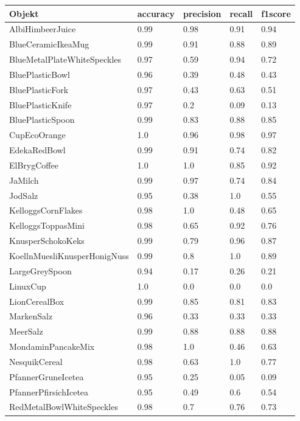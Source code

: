 \begin{table}
\centering
\small
{}
\begin{tabularx}{\textwidth}{Xllll}
\textbf{Objekt}	& \textbf{\gls{accuracy}} & \textbf{\gls{precision}}	& \textbf{\gls{recall}}	& \textbf{\gls{f1score}} \\ \hline
AlbiHimbeerJuice & 0.99 & 0.98 & 0.91 & 0.94 \\  
BlueCeramicIkeaMug & 0.99 & 0.91 & 0.88 & 0.89 \\  
BlueMetalPlateWhiteSpeckles & 0.97 & 0.59 & 0.94 & 0.72 \\  
BluePlasticBowl & 0.96 & 0.39 & 0.48 & 0.43 \\  
BluePlasticFork & 0.97 & 0.43 & 0.63 & 0.51 \\  
BluePlasticKnife & 0.97 & 0.2 & 0.09 & 0.13 \\  
BluePlasticSpoon & 0.99 & 0.83 & 0.88 & 0.85 \\  
CupEcoOrange & 1.0 & 0.96 & 0.98 & 0.97 \\  
EdekaRedBowl & 0.99 & 0.91 & 0.74 & 0.82 \\  
ElBrygCoffee & 1.0 & 1.0 & 0.85 & 0.92 \\  
JaMilch & 0.99 & 0.97 & 0.74 & 0.84 \\  
JodSalz & 0.95 & 0.38 & 1.0 & 0.55 \\  
KelloggsCornFlakes & 0.98 & 1.0 & 0.48 & 0.65 \\  
KelloggsToppasMini & 0.98 & 0.65 & 0.92 & 0.76 \\  
KnusperSchokoKeks & 0.99 & 0.79 & 0.96 & 0.87 \\  
KoellnMuesliKnusperHonigNuss & 0.99 & 0.8 & 1.0 & 0.89 \\  
LargeGreySpoon & 0.94 & 0.17 & 0.26 & 0.21 \\  
LinuxCup & 1.0 & 0.0 & 0.0 & 0.0 \\  
LionCerealBox & 0.99 & 0.85 & 0.81 & 0.83 \\  
MarkenSalz & 0.96 & 0.33 & 0.33 & 0.33 \\  
MeerSalz & 0.99 & 0.88 & 0.88 & 0.88 \\  
MondaminPancakeMix & 0.98 & 1.0 & 0.46 & 0.63 \\  
NesquikCereal & 0.98 & 0.63 & 1.0 & 0.77 \\  
PfannerGruneIcetea & 0.95 & 0.25 & 0.05 & 0.09 \\  
PfannerPfirsichIcetea & 0.95 & 0.49 & 0.6 & 0.54 \\  
RedMetalBowlWhiteSpeckles & 0.98 & 0.7 & 0.76 & 0.73 \\  

\end{tabularx}
\end{table}
